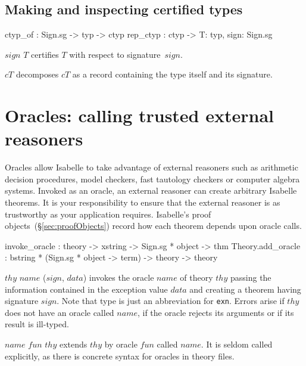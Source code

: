 \subsection{Making and inspecting certified types}
\begin{ttbox}
ctyp_of  : Sign.sg -> typ -> ctyp
rep_ctyp : ctyp -> {\ttlbrace}T: typ, sign: Sign.sg\ttrbrace
\end{ttbox}
\begin{ttdescription}
\item[\ttindexbold{ctyp_of} $sign$ $T$] 
certifies $T$ with respect to signature~$sign$.

\item[\ttindexbold{rep_ctyp} $cT$]
decomposes $cT$ as a record containing the type itself and its signature.
\end{ttdescription}


\section{Oracles: calling trusted external reasoners}
\label{sec:oracles}

Oracles allow Isabelle to take advantage of external reasoners such as
arithmetic decision procedures, model checkers, fast tautology checkers or
computer algebra systems.  Invoked as an oracle, an external reasoner can
create arbitrary Isabelle theorems.  It is your responsibility to ensure that
the external reasoner is as trustworthy as your application requires.
Isabelle's proof objects~(\S\ref{sec:proofObjects}) record how each theorem
depends upon oracle calls.

\begin{ttbox}
invoke_oracle     : theory -> xstring -> Sign.sg * object -> thm
Theory.add_oracle : bstring * (Sign.sg * object -> term) -> theory -> theory
\end{ttbox}
\begin{ttdescription}
\item[\ttindexbold{invoke_oracle} $thy$ $name$ ($sign$, $data$)]
  invokes the oracle $name$ of theory $thy$ passing the information
  contained in the exception value $data$ and creating a theorem
  having signature $sign$.  Note that type  is just an
  abbreviation for \texttt{exn}.  Errors arise if $thy$ does not have
  an oracle called $name$, if the oracle rejects its arguments or if
  its result is ill-typed.
  
\item[\ttindexbold{Theory.add_oracle} $name$ $fun$ $thy$] extends
  $thy$ by oracle $fun$ called $name$.  It is seldom called
  explicitly, as there is concrete syntax for oracles in theory files.
\end{ttdescription}

